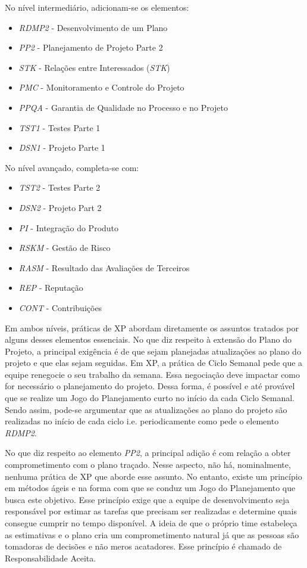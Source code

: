 No nível intermediário, adicionam-se os elementos:
\begin{itemize}
\item \textit{RDMP2} - Desenvolvimento de um Plano
\item \textit{PP2} - Planejamento de Projeto Parte 2
\item \textit{STK} - Relações entre Interessados (\textit{STK})
\item \textit{PMC} - Monitoramento e Controle do Projeto
\item \textit{PPQA} - Garantia de Qualidade no Processo e no Projeto
\item \textit{TST1} - Testes Parte 1
\item \textit{DSN1} - Projeto Parte 1
\end{itemize}

No nível avançado, completa-se com:
\begin{itemize}
\item \textit{TST2} - Testes Parte 2
\item \textit{DSN2} - Projeto Part 2
\item \textit{PI} - Integração do Produto
\item \textit{RSKM} - Gestão de Risco
\item \textit{RASM} - Resultado das Avaliações de Terceiros
\item \textit{REP} - Reputação
\item \textit{CONT} - Contribuições
\end{itemize}

Em ambos níveis, práticas de XP abordam diretamente os assuntos
tratados por alguns desses elementos essenciais. No que diz respeito à
extensão do Plano do Projeto, a principal exigência é de que sejam
planejadas atualizações ao plano do projeto e que elas sejam
seguidas. Em XP, a prática de Ciclo Semanal pede que a equipe
renegocie o seu trabalho da semana. Essa negociação deve impactar como
for necessário o planejamento do projeto. Dessa forma, é possível e
até provável que se realize um Jogo do Planejamento curto no início da
cada Ciclo Semanal. Sendo assim, pode-se argumentar que as
atualizações ao plano do projeto são realizadas no início de cada
ciclo i.e. periodicamente como pede o elemento \textit{RDMP2}.

No que diz respeito ao elemento \textit{PP2}, a principal adição é com
relação a obter comprometimento com o plano traçado. Nesse aspecto,
não há, nominalmente, nenhuma prática de XP que aborde esse
assunto. No entanto, existe um princípio em métodos ágeis e na forma
com que se conduz um Jogo do Planejamento que busca este
objetivo. Esse princípio exige que a equipe de desenvolvimento seja
responsável por estimar as tarefas que precisam ser realizadas e
determine quais consegue cumprir no tempo disponível. A ideia de que o
próprio time estabeleça as estimativas e o plano cria um
comprometimento natural já que as pessoas são tomadoras de decisões e
não meros acatadores. Esse princípio é chamado de Responsabilidade
Aceita.

